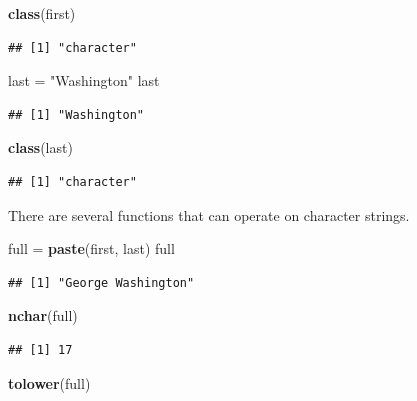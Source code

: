 \documentclass[
]{book}
\newenvironment{Shaded}{\begin{snugshade}}{\end{snugshade}}
\newcommand{\KeywordTok}[1]{\textcolor[rgb]{0.13,0.29,0.53}{\textbf{#1}}}
\newcommand{\NormalTok}[1]{#1}
\newcommand{\StringTok}[1]{\textcolor[rgb]{0.31,0.60,0.02}{#1}}
\begin{document}
\begin{Shaded}
\begin{Highlighting}[]
\KeywordTok{class}\NormalTok{(first)}
\end{Highlighting}
\end{Shaded}

\begin{verbatim}
## [1] "character"
\end{verbatim}

\begin{Shaded}
\begin{Highlighting}[]
\NormalTok{last =}\StringTok{ "Washington"}
\NormalTok{last}
\end{Highlighting}
\end{Shaded}

\begin{verbatim}
## [1] "Washington"
\end{verbatim}

\begin{Shaded}
\begin{Highlighting}[]
\KeywordTok{class}\NormalTok{(last)}
\end{Highlighting}
\end{Shaded}

\begin{verbatim}
## [1] "character"
\end{verbatim}

There are several functions that can operate on character strings.

\begin{Shaded}
\begin{Highlighting}[]
\NormalTok{full =}\StringTok{ }\KeywordTok{paste}\NormalTok{(first, last)}
\NormalTok{full }
\end{Highlighting}
\end{Shaded}

\begin{verbatim}
## [1] "George Washington"
\end{verbatim}

\begin{Shaded}
\begin{Highlighting}[]
\KeywordTok{nchar}\NormalTok{(full)}
\end{Highlighting}
\end{Shaded}

\begin{verbatim}
## [1] 17
\end{verbatim}

\begin{Shaded}
\begin{Highlighting}[]
\KeywordTok{tolower}\NormalTok{(full)}
\end{Highlighting}
\end{Shaded}
\end{document}
